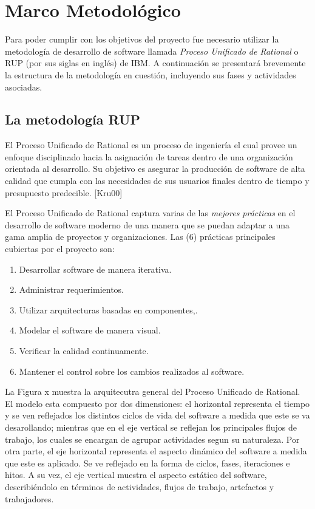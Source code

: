 \chapter{Marco Metodológico}
Para poder cumplir con los objetivos del proyecto fue necesario utilizar la metodología de desarrollo de software llamada \textit{Proceso Unificado de Rational} o RUP (por sus siglas en inglés) de IBM. A continuación se presentará brevemente la estructura de la metodología en cuestión, incluyendo sus fases y actividades asociadas.

\section{La metodología RUP}
El Proceso Unificado de Rational es un proceso de ingeniería el cual provee un enfoque disciplinado hacia la asignación de tareas dentro de una organización orientada al desarrollo. Su objetivo es asegurar la producción de software de alta calidad que cumpla con las necesidades de sus usuarios finales dentro de tiempo y presupuesto predecible. [Kru00]

El Proceso Unificado de Rational captura varias  de las \textit{mejores prácticas}  en el desarrollo de software moderno de una manera que se puedan adaptar  a una gama amplia de proyectos y organizaciones. Las (6) prácticas principales cubiertas por el proyecto son: 
\begin{enumerate}
\item Desarrollar software de manera iterativa.
\item Administrar requerimientos.
\item Utilizar arquitecturas basadas en componentes,.
\item Modelar el software de manera visual.
\item Verificar la calidad continuamente.
\item Mantener el control sobre los cambios realizados al software.
\end{enumerate}

La Figura x  muestra la arquitecutra general  del Proceso Unificado de Rational. El modelo esta compuesto por dos dimensiones: el horizontal representa el tiempo y se ven reflejados los distintos ciclos de vida del software a medida que este se va desarollando; mientras que en el eje vertical se reflejan los principales flujos de trabajo, los cuales se encargan de agrupar actividades segun su naturaleza.
Por otra parte, el eje horizontal representa el aspecto dinámico del software a medida que este es aplicado. Se ve reflejado en la forma de ciclos, fases, iteraciones e hitos. A su vez, el eje vertical muestra el aspecto estático del software, describiéndolo en términos de actividades, flujos de trabajo, artefactos y trabajadores. 

